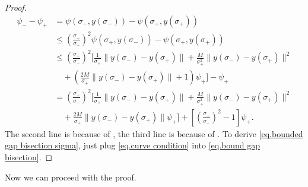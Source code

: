 \documentclass{mcom-l}
\numberwithin{equation}{section}
\begin{document}
\begin{proof}
    \begin{equation*}
        \begin{aligned}
            \psi_- -\psi_+
             & = \psi(\sigma_-,y(\sigma_-))-\psi(\sigma_+,y(\sigma_+))                                               \\
             & \leq \left(\frac{\sigma_+}{\sigma_-}\right)^2 \psi(\sigma_+,y(\sigma_-)) - \psi(\sigma_+,y(\sigma_+)) \\
             & \leq \left(\frac{\sigma_+}{\sigma_-}\right)^2 \Bigg[
                \frac{1}{\sigma_+}\|y(\sigma_-)-y(\sigma_+)\|
            + \frac{M}{\sigma_+^2} \|y(\sigma_-)-y(\sigma_+)\|^2                                                     \\
             & \quad + \left( \frac{2M}{\sigma_+} \|y(\sigma_-)-y(\sigma_+)\| + 1 \right)\psi_+
            \Bigg] - \psi_+                                                                                          \\
             & = \left(\frac{\sigma_+}{\sigma_-} \right)^2 \Bigg[
                \frac{1}{\sigma_+} \|y(\sigma_-)-y(\sigma_+)\|
            + \frac{M}{\sigma_+^2} \|y(\sigma_-)-y(\sigma_+)\|^2                                                     \\
             & \quad + \frac{2M}{\sigma_+} \|y(\sigma_-)-y(\sigma_+)\|\psi_+
                \Bigg] + \left[ \left(\frac{\sigma_+}{\sigma_-} \right)^2 - 1 \right] \psi_+.
        \end{aligned}
    \end{equation*}
    The second line is because of , the third line is because of . To derive \eqref{eq.bounded gap bisection sigma}, just plug \eqref{eq.curve condition} into \eqref{eq.bound gap bisection}.
\end{proof}
Now we can proceed with the proof.
\end{document}
